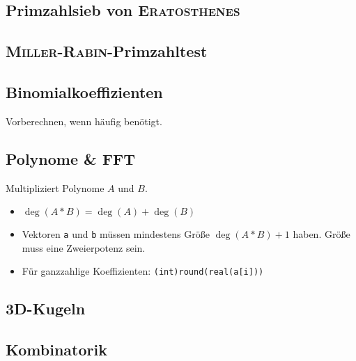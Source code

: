 \subsection{Primzahlsieb von \textsc{Eratosthenes}}


\subsection{\textsc{Miller}-\textsc{Rabin}-Primzahltest}


\subsection{Binomialkoeffizienten}
Vorberechnen, wenn häufig benötigt.


\subsection{Polynome \& FFT}
Multipliziert Polynome $A$ und $B$.
\begin{itemize}[nosep]
	\item $\deg(A * B) = \deg(A) + \deg(B)$
	\item Vektoren \lstinline{a} und \lstinline{b} müssen mindestens Größe
	$\deg(A * B) + 1$ haben.
	Größe muss eine Zweierpotenz sein.
	\item Für ganzzahlige Koeffizienten: \lstinline{(int)round(real(a[i]))}
\end{itemize}


\subsection{3D-Kugeln}


\subsection{Kombinatorik}

